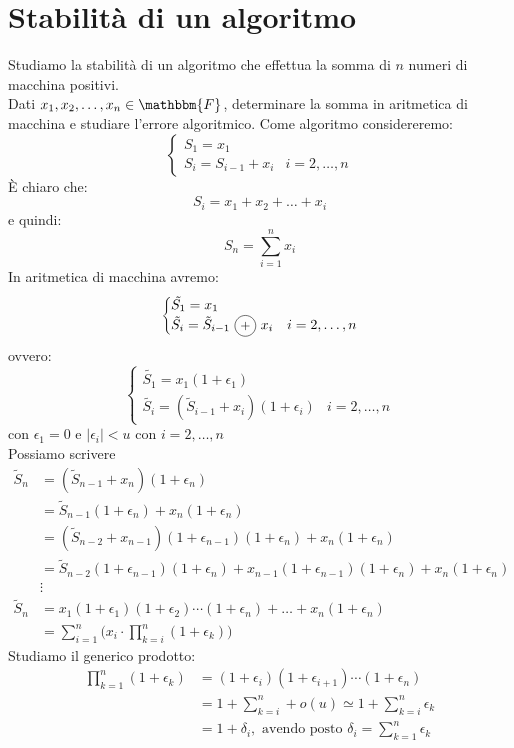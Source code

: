 \documentclass[12pt]{report}
\newcommand{\circled}[1]{%
	\begin{tikzpicture}[baseline=(char.base)]
		\node[shape=circle, draw, inner sep=1.2pt, minimum size=1.5em] (char) {\small #1};
	\end{tikzpicture}%
}
\begin{document}
\section{Stabilità di un algoritmo}
Studiamo la stabilità di un algoritmo che effettua la somma di $n$ numeri di macchina positivi. \\
Dati $x_1, x_2, \dots, x_n \in \mathbbm{F}$, determinare la somma in aritmetica di macchina e studiare l'errore algoritmico. Come algoritmo considereremo:
\[
\begin{cases}
S_1 = x_1 \\
S_i = S_{i-1} + x_i & i = 2, \dots, n
\end{cases}
\]
È chiaro che:
\[
S_i = x_1 + x_2 + \dots + x_i
\]
e quindi:
\[
S_n = \sum_{i=1}^{n}x_i
\]
In aritmetica di macchina avremo:
\[
\begin{cases}\tilde{S_1} = x_1 \\
\tilde{S_i} = \tilde{S}_{i-1}\ \circled{+}\ x_i & i = 2, \dots, n\end{cases}
\]
ovvero:
\[
\begin{cases}\tilde{S_1} = x_1(1 + \epsilon_1) \\
\tilde{S_i} = (\tilde{S}_{i-1} + x_i)(1+\epsilon_i) & i = 2, \dots, n\end{cases}
\]
con $\epsilon_1 = 0$ e $|\epsilon_i| < u$ con $i = 2, \dots, n$ \\
Possiamo scrivere
\begin{align*}
	\tilde{S}_n &= (\tilde{S}_{n-1} + x_n)(1 + \epsilon_n) \\
	&= \tilde{S}_{n-1}(1+\epsilon_n) + x_n(1+\epsilon_n) \\
	&= (\tilde{S}_{n-2} + x_{n-1})(1+\epsilon_{n-1})(1+\epsilon_n) + x_n(1+\epsilon_n) \\
	&= \tilde{S}_{n-2}(1+\epsilon_{n-1})(1+\epsilon_n) + x_{n-1}(1+\epsilon_{n-1})(1+\epsilon_n) + x_n(1 + \epsilon_n) \\
	&\vdots \\
	\tilde{S}_n &= x_1(1+\epsilon_1)(1+\epsilon_2)\cdots(1+\epsilon_n) + \dots + x_n(1+\epsilon_n) \\
	&= \sum_{i=1}^{n}\Bigg(x_i \cdot \prod_{k=i}^{n}(1+\epsilon_k)\Bigg)
\end{align*}
Studiamo il generico prodotto:
\begin{align*}
	\prod_{k=1}^{n}(1 + \epsilon_k) &= (1+\epsilon_i)(1+\epsilon_{i+1}) \cdots (1 + \epsilon_n) \\
	&= 1 + \sum_{k=i}^{n} + o(u) \simeq 1 + \sum_{k=i}^{n}\epsilon_k \\
	&= 1 + \delta_i, \text{ avendo posto } \delta_i = \sum_{k=1}^{n}\epsilon_k
\end{align*}
\end{document}
